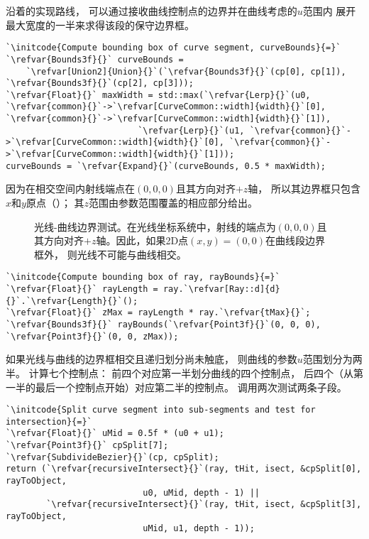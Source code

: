 沿着的实现路线，
可以通过接收曲线控制点的边界并在曲线考虑的$u$范围内
展开最大宽度的一半来求得该段的保守边界框。
\begin{lstlisting}
`\initcode{Compute bounding box of curve segment, curveBounds}{=}`
`\refvar{Bounds3f}{}` curveBounds =
    `\refvar[Union2]{Union}{}`(`\refvar{Bounds3f}{}`(cp[0], cp[1]), `\refvar{Bounds3f}{}`(cp[2], cp[3]));
`\refvar{Float}{}` maxWidth = std::max(`\refvar{Lerp}{}`(u0, `\refvar{common}{}`->`\refvar[CurveCommon::width]{width}{}`[0], `\refvar{common}{}`->`\refvar[CurveCommon::width]{width}{}`[1]),
                          `\refvar{Lerp}{}`(u1, `\refvar{common}{}`->`\refvar[CurveCommon::width]{width}{}`[0], `\refvar{common}{}`->`\refvar[CurveCommon::width]{width}{}`[1]));
curveBounds = `\refvar{Expand}{}`(curveBounds, 0.5 * maxWidth);
\end{lstlisting}

因为在相交空间内射线端点在$(0,0,0)$且其方向对齐$+z$轴，
所以其边界框只包含$x$和$y$原点（）；
其$z$范围由参数范围覆盖的相应部分给出。
\begin{figure}[htbp]
    \centering
    \caption{光线-曲线边界测试。在光线坐标系统中，射线的端点为$(0,0,0)$且
        其方向对齐$+z$轴。因此，如果2D点$(x,y)=(0,0)$在曲线段边界框外，
        则光线不可能与曲线相交。}
    \label{fig:3.20}
\end{figure}
\begin{lstlisting}
`\initcode{Compute bounding box of ray, rayBounds}{=}` 
`\refvar{Float}{}` rayLength = ray.`\refvar[Ray::d]{d}{}`.`\refvar{Length}{}`();
`\refvar{Float}{}` zMax = rayLength * ray.`\refvar{tMax}{}`;
`\refvar{Bounds3f}{}` rayBounds(`\refvar{Point3f}{}`(0, 0, 0), `\refvar{Point3f}{}`(0, 0, zMax));
\end{lstlisting}

如果光线与曲线的边界框相交且递归划分尚未触底，
则曲线的参数$u$范围划分为两半。
计算七个控制点：
前四个对应第一半划分曲线的四个控制点，
后四个（从第一半的最后一个控制点开始）对应第二半的控制点。
调用两次测试两条子段。
\begin{lstlisting}
`\initcode{Split curve segment into sub-segments and test for intersection}{=}`
`\refvar{Float}{}` uMid = 0.5f * (u0 + u1);
`\refvar{Point3f}{}` cpSplit[7];
`\refvar{SubdivideBezier}{}`(cp, cpSplit);
return (`\refvar{recursiveIntersect}{}`(ray, tHit, isect, &cpSplit[0], rayToObject,
                           u0, uMid, depth - 1) ||
        `\refvar{recursiveIntersect}{}`(ray, tHit, isect, &cpSplit[3], rayToObject,
                           uMid, u1, depth - 1));  
\end{lstlisting}

